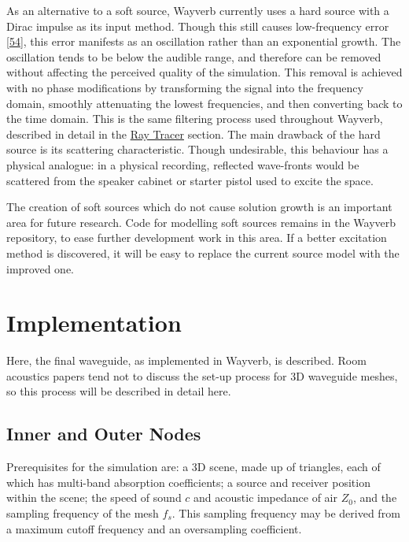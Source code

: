 \documentclass[]{scrreprt}
\begin{document}
As an alternative to a soft source, Wayverb currently uses a hard source
with a Dirac impulse as its input method. Though this still causes
low-frequency error
{[}\protect\hyperlink{ref-sheafferux5fphysicalux5f2014}{54}{]}, this
error manifests as an oscillation rather than an exponential growth. The
oscillation tends to be below the audible range, and therefore can be
removed without affecting the perceived quality of the simulation. This
removal is achieved with no phase modifications by transforming the
signal into the frequency domain, smoothly attenuating the lowest
frequencies, and then converting back to the time domain. This is the
same filtering process used throughout Wayverb, described in detail in
the
\href{\%7B\%7B\%20site.baseurl\%20\%7D\%7D\%7B\%\%20link\%20ray_tracer.md\%20\%\%7D}{Ray
Tracer} section. The main drawback of the hard source is its scattering
characteristic. Though undesirable, this behaviour has a physical
analogue: in a physical recording, reflected wave-fronts would be
scattered from the speaker cabinet or starter pistol used to excite the
space.

The creation of soft sources which do not cause solution growth is an
important area for future research. Code for modelling soft sources
remains in the Wayverb repository, to ease further development work in
this area. If a better excitation method is discovered, it will be easy
to replace the current source model with the improved one.

\section{Implementation}\label{implementation-2}

Here, the final waveguide, as implemented in Wayverb, is described. Room
acoustics papers tend not to discuss the set-up process for 3D waveguide
meshes, so this process will be described in detail here.

\subsection{Inner and Outer Nodes}\label{inner-and-outer-nodes}

Prerequisites for the simulation are: a 3D scene, made up of triangles,
each of which has multi-band absorption coefficients; a source and
receiver position within the scene; the speed of sound \(c\) and
acoustic impedance of air \(Z_0\), and the sampling frequency of the
mesh \(f_s\). This sampling frequency may be derived from a maximum
cutoff frequency and an oversampling coefficient.
\end{document}
